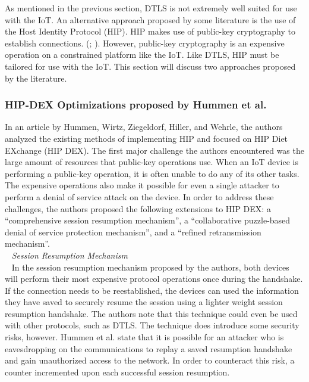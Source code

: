 \documentclass[letterpaper, 12pt]{article}
\begin{document}
\begin{flushleft}
As mentioned in the previous section, DTLS is not extremely well suited for use with the IoT. An alternative
approach proposed by some literature is the use of the Host Identity Protocol (HIP). HIP makes use of public-key
cryptography to establish connections. (\cite{Hummen}; \cite{Garcia-Morchon:2013:SII:2462096.2462117}). However,
public-key cryptography is an expensive operation on a constrained platform like the IoT. Like DTLS, HIP must
be tailored for use with the IoT. This section will discuss two approaches proposed by the literature. 

\subsubsection*{HIP-DEX Optimizations proposed by Hummen et al.}
In an article by Hummen, Wirtz, Ziegeldorf, Hiller, and Wehrle, the authors analyzed the existing methods of 
implementing HIP and focused on HIP Diet EXchange (HIP DEX). The first major challenge the authors encountered
was the large amount of resources that public-key operations use. When an IoT device is performing a public-key operation,
it is often unable to do any of its other tasks. The expensive operations also make it possible for even a single attacker
to perform a denial of service attack on the device. In order to address these challenges, the authors proposed the following extensions to HIP DEX: 
a ``comprehensive session resumption mechanism'', a ``collaborative puzzle-based denial of service protection mechanism'', and a
``refined retransmission mechanism''. \\
~\newline
\textit{Session Resumption Mechanism}\\ 
~\newline
In the session resumption mechanism proposed by the authors, both devices will perform their most expensive protocol operations once during the handshake.
If the connection needs to be reestablished, the devices can used the information they have saved to securely resume the session using a lighter weight
session resumption handshake. The authors note that this technique could even be used with other protocols, such as DTLS. The technique does introduce some
security risks, however. Hummen et al. state that it is possible for an attacker who is eavesdropping on the communications to replay a saved resumption
handshake and gain unauthorized access to the network. In order to counteract this risk, a counter incremented upon each successful session resumption. 

\end{flushleft}
\end{document}
